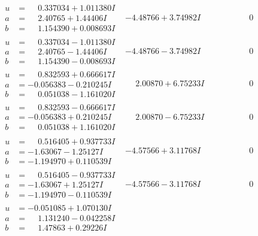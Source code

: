\documentclass[1p]{elsarticle_modified}
\theoremstyle{definition}
\begin{document}
$$\begin{array}{c|c|c}
\begin{aligned}
u &= \phantom{-}0.337034 + 1.011380 I \\
a &= \phantom{-}2.40765 + 1.44406 I \\
b &= \phantom{-}1.154390 + 0.008693 I\end{aligned}
 & -4.48766 + 3.74982 I & \phantom{-0.000000 } 0 \\ \hline\begin{aligned}
u &= \phantom{-}0.337034 - 1.011380 I \\
a &= \phantom{-}2.40765 - 1.44406 I \\
b &= \phantom{-}1.154390 - 0.008693 I\end{aligned}
 & -4.48766 - 3.74982 I & \phantom{-0.000000 } 0 \\ \hline\begin{aligned}
u &= \phantom{-}0.832593 + 0.666617 I \\
a &= -0.056383 - 0.210245 I \\
b &= \phantom{-}0.051038 - 1.161020 I\end{aligned}
 & \phantom{-}2.00870 + 6.75233 I & \phantom{-0.000000 } 0 \\ \hline\begin{aligned}
u &= \phantom{-}0.832593 - 0.666617 I \\
a &= -0.056383 + 0.210245 I \\
b &= \phantom{-}0.051038 + 1.161020 I\end{aligned}
 & \phantom{-}2.00870 - 6.75233 I & \phantom{-0.000000 } 0 \\ \hline\begin{aligned}
u &= \phantom{-}0.516405 + 0.937733 I \\
a &= -1.63067 - 1.25127 I \\
b &= -1.194970 + 0.110539 I\end{aligned}
 & -4.57566 + 3.11768 I & \phantom{-0.000000 } 0 \\ \hline\begin{aligned}
u &= \phantom{-}0.516405 - 0.937733 I \\
a &= -1.63067 + 1.25127 I \\
b &= -1.194970 - 0.110539 I\end{aligned}
 & -4.57566 - 3.11768 I & \phantom{-0.000000 } 0 \\ \hline\begin{aligned}
u &= -0.051085 + 1.070130 I \\
a &= \phantom{-}1.131240 - 0.042258 I \\
b &= \phantom{-}1.47863 + 0.29226 I\end{aligned}

\end{array}$$
\end{document}
